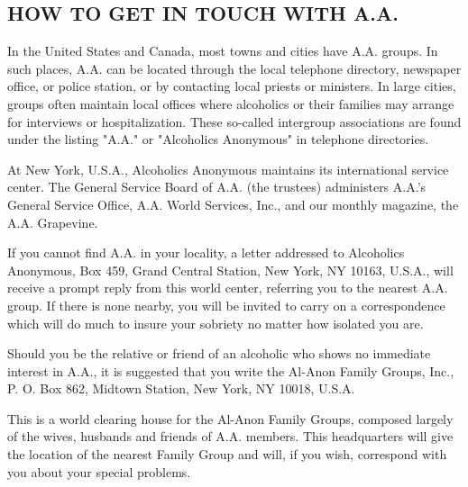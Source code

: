 

\subsection*{HOW TO GET IN TOUCH WITH A.A.}

\begin{biblechapter}
    In the United States and Canada, 
    most towns and cities have A.A. groups.
\verse In such places, 
    A.A. can be located through the local telephone directory, 
    newspaper office,
    or police station, 
    or by contacting local priests or ministers.
\verse In large cities, 
    groups often maintain local offices 
    where alcoholics or their families 
    may arrange for interviews or hospitalization.
\verse These so-called intergroup associations are found under the listing 
    "A.A." or "Alcoholics Anonymous" in telephone directories.

    At New York, U.S.A., 
    Alcoholics Anonymous maintains its international service center.
\verse The General Service Board of A.A. (the trustees) 
    administers A.A.'s General Service Office, A.A. World Services, Inc., 
    and our monthly magazine, the A.A. Grapevine.

\verse If you cannot find A.A. in your locality, 
    a letter addressed to Alcoholics Anonymous, 
    Box 459, Grand Central Station, New York, NY 10163, U.S.A., 
    will receive a prompt reply from this world center, 
    referring you to the nearest A.A. group.
\verse If there is none nearby, 
    you will be invited to carry on a correspondence 
    which will do much to insure your sobriety 
    no matter how isolated you are.

    Should you be the relative or friend of an alcoholic 
    who shows no immediate interest in A.A., 
    it is suggested that you write the Al-Anon Family Groups, Inc., 
    P. O. Box 862, Midtown Station, New York, NY 10018, U.S.A.

\verse This is a world clearing house for the Al-Anon Family Groups, 
    composed largely of the wives, husbands and friends of A.A. members.
\verse This headquarters will give the location of the nearest Family Group 
    and will, if you wish, correspond with you about your special problems.
\end{biblechapter}
